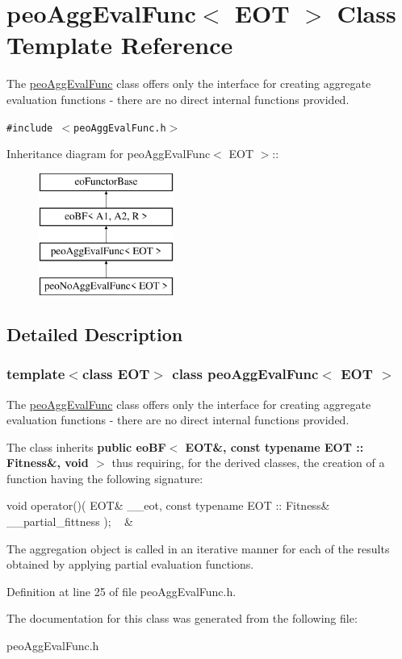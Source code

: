 \hypertarget{classpeoAggEvalFunc}{
\section{peo\-Agg\-Eval\-Func$<$ EOT $>$ Class Template Reference}
\label{classpeoAggEvalFunc}
}
The \hyperlink{classpeoAggEvalFunc}{peo\-Agg\-Eval\-Func} class offers only the interface for creating aggregate evaluation functions - there are no direct internal functions provided.  


{\tt \#include $<$peo\-Agg\-Eval\-Func.h$>$}

Inheritance diagram for peo\-Agg\-Eval\-Func$<$ EOT $>$::\begin{figure}[H]
\begin{center}
\leavevmode
\includegraphics[height=4cm]{classpeoAggEvalFunc}
\end{center}
\end{figure}


\subsection{Detailed Description}
\subsubsection*{template$<$class EOT$>$ class peo\-Agg\-Eval\-Func$<$ EOT $>$}

The \hyperlink{classpeoAggEvalFunc}{peo\-Agg\-Eval\-Func} class offers only the interface for creating aggregate evaluation functions - there are no direct internal functions provided. 

The class inherits {\bf public eo\-BF$<$ EOT\&, const typename EOT :: Fitness\&, void $>$} thus requiring, for the derived classes, the creation of a function having the following signature:

\begin{TabularC}{2}
\hline
void operator()( EOT\& \_\-\_\-eot, const typename EOT :: Fitness\& \_\-\_\-partial\_\-fittness ); ~ &~  \\\hline
\end{TabularC}


The aggregation object is called in an iterative manner for each of the results obtained by applying partial evaluation functions. 



Definition at line 25 of file peo\-Agg\-Eval\-Func.h.

The documentation for this class was generated from the following file:\begin{CompactItemize}
\item 
peo\-Agg\-Eval\-Func.h\end{CompactItemize}
